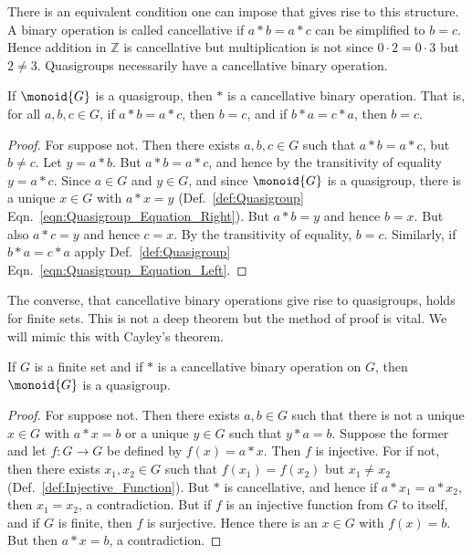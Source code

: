         There is an equivalent condition one can impose that gives rise to this
        structure. A binary operation is called cancellative if $a*b=a*c$ can be
        simplified to $b=c$. Hence addition in $\mathbb{Z}$ is cancellative but
        multiplication is not since $0\cdot{2}=0\cdot{3}$ but $2\ne{3}$.
        Quasigroups necessarily have a cancellative binary operation.
        \begin{theorem}
            If $\monoid{G}$ is a quasigroup, then $*$ is a cancellative binary
            operation. That is, for all $a,b,c\in{G}$, if $a*b=a*c$, then
            $b=c$, and if $b*a=c*a$, then $b=c$.
        \end{theorem}
        \begin{proof}
            For suppose not. Then there exists $a,b,c\in{G}$ such that
            $a*b=a*c$, but $b\ne{c}$. Let $y=a*b$. But $a*b=a*c$, and hence by
            the transitivity of equality $y=a*c$. Since $a\in{G}$ and $y\in{G}$,
            and since $\monoid{G}$ is a quasigroup, there is a unique $x\in{G}$
            with $a*x=y$ (Def.~\ref{def:Quasigroup}
            Eqn.~\ref{eqn:Quasigroup_Equation_Right}). But $a*b=y$ and hence
            $b=x$. But also $a*c=y$ and hence $c=x$. By the transitivity of
            equality, $b=c$. Similarly, if $b*a=c*a$ apply
            Def.~\ref{def:Quasigroup} Eqn.~\ref{eqn:Quasigroup_Equation_Left}.
        \end{proof}
        The converse, that cancellative binary operations give rise to
        quasigroups, holds for finite sets. This is not a deep theorem but the
        method of proof is vital. We will mimic this with Cayley's theorem.
        \begin{theorem}
            \label{thm:Finite_Cancellative_Op_is_Quasigroup}%
            If $G$ is a finite set and if $*$ is a cancellative binary operation
            on $G$, then $\monoid{G}$ is a quasigroup.
        \end{theorem}
        \begin{proof}
            For suppose not. Then there exists $a,b\in{G}$ such that there is
            not a unique $x\in{G}$ with $a*x=b$ or a unique $y\in{G}$ such that
            $y*a=b$. Suppose the former and let $f:G\rightarrow{G}$ be defined
            by $f(x)=a*x$. Then $f$ is injective. For if not, then there exists
            $x_{1},x_{2}\in{G}$ such that $f(x_{1})=f(x_{2})$ but
            $x_{1}\ne{x}_{2}$ (Def.~\ref{def:Injective_Function}). But $*$ is
            cancellative, and hence if $a*x_{1}=a*x_{2}$, then $x_{1}=x_{2}$,
            a contradiction. But if $f$ is an injective function from $G$ to
            itself, and if $G$ is finite, then $f$ is surjective. Hence there is
            an $x\in{G}$ with $f(x)=b$. But then $a*x=b$, a contradiction.
        \end{proof}
